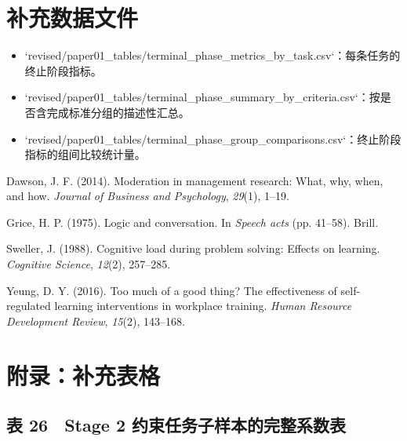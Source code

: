 \documentclass[12pt,a4paper,openany,oneside]{ctexrep}
\begin{document}
\section{补充数据文件}


\begin{itemize}
\item `revised/paper01\_tables/terminal\_phase\_metrics\_by\_task.csv`：每条任务的终止阶段指标。

\item `revised/paper01\_tables/terminal\_phase\_summary\_by\_criteria.csv`：按是否含完成标准分组的描述性汇总。

\item `revised/paper01\_tables/terminal\_phase\_group\_comparisons.csv`：终止阶段指标的组间比较统计量。
\end{itemize}


Dawson, J. F. (2014). Moderation in management research: What, why, when, and how. \emph{Journal of Business and Psychology}, \emph{29}(1), 1–19.

Grice, H. P. (1975). Logic and conversation. In \emph{Speech acts} (pp. 41–58). Brill.

Sweller, J. (1988). Cognitive load during problem solving: Effects on learning. \emph{Cognitive Science}, \emph{12}(2), 257–285.

Yeung, D. Y. (2016). Too much of a good thing? The effectiveness of self-regulated learning interventions in workplace training. \emph{Human Resource Development Review}, \emph{15}(2), 143–168.

\section{附录：补充表格}


\subsection{表 26　Stage 2 约束任务子样本的完整系数表}


\begin{table}[htbp]
\centering
\caption{表 26：Stage 2 约束任务子样本的完整系数表}
\small
{}
\end{table}
\end{document}
